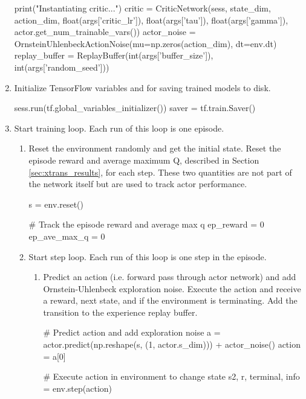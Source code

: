 \begin{enumerate}
\begin{python}[caption={Network, Noise, and Experience Replay Buffer Initialization},label={list:net_init},xleftmargin=\dimexpr-\csname @totalleftmargin\endcsname]
print("Instantiating critic...")
critic = CriticNetwork(sess, state_dim, action_dim,
                       float(args['critic_lr']), float(args['tau']),
                       float(args['gamma']),
                       actor.get_num_trainable_vars())
actor_noise = OrnsteinUhlenbeckActionNoise(mu=np.zeros(action_dim), dt=env.dt)
replay_buffer = ReplayBuffer(int(args['buffer_size']), int(args['random_seed']))
\end{python}
\item Initialize TensorFlow variables and  for saving trained models to disk.
\begin{python}[caption={Saver Initialization},label={list:saver_init},xleftmargin=\dimexpr-\csname @totalleftmargin\endcsname]
sess.run(tf.global_variables_initializer())
saver = tf.train.Saver()
\end{python}
\item Start training loop. Each run of this loop is one episode.
	\begin{enumerate}
	\item Reset the environment randomly and get the initial state. Reset the episode reward and average maximum Q, described in Section \ref{sec:xtrans_results}, for each step. These two quantities are not part of the network itself but are used to track actor performance. 
	\begin{python}[caption={Episode Reset},label={list:ep_reset},xleftmargin=\dimexpr-\csname @totalleftmargin\endcsname]
s = env.reset()

# Track the episode reward and average max q
ep_reward = 0
ep_ave_max_q = 0
	\end{python}
	\item Start step loop. Each run of this loop is one step in the episode.
		\begin{enumerate}
		\item Predict an action (i.e. forward pass through actor network) and add Ornstein-Uhlenbeck exploration noise. Execute the action and receive a reward, next state, and if the environment is terminating. Add the transition to the experience replay buffer.
		\begin{python}[caption={Actor Predict and Step},label={list:act_pred_step},xleftmargin=\dimexpr-\csname @totalleftmargin\endcsname]
# Predict action and add exploration noise
a = actor.predict(np.reshape(s, (1, actor.s_dim))) + actor_noise()
action = a[0]

# Execute action in environment to change state
s2, r, terminal, info = env.step(action)


\end{python}
\end{enumerate}
\end{enumerate}
\end{enumerate}

